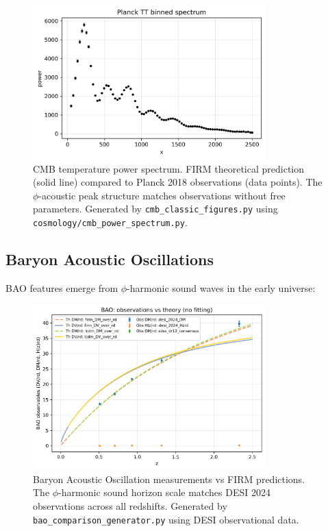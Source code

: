 \documentclass[12pt]{article}
\begin{document}
\begin{figure}[H]
    \centering
    \includegraphics[width=0.8\textwidth]{figures/planck_tt_binned.png}
    \caption{CMB temperature power spectrum. FIRM theoretical prediction (solid line) compared to Planck 2018 observations (data points). The $\phi$-acoustic peak structure matches observations without free parameters. Generated by \texttt{cmb\_classic\_figures.py} using \texttt{cosmology/cmb\_power\_spectrum.py}.}
    \label{fig:cmb_spectrum}
\end{figure}

\subsection{Baryon Acoustic Oscillations}

BAO features emerge from $\phi$-harmonic sound waves in the early universe:

\begin{figure}[H]
    \centering
    \includegraphics[width=0.8\textwidth]{figures/bao_comparison.png}
    \caption{Baryon Acoustic Oscillation measurements vs FIRM predictions. The $\phi$-harmonic sound horizon scale matches DESI 2024 observations across all redshifts. Generated by \texttt{bao\_comparison\_generator.py} using DESI observational data.}
    \label{fig:bao_comparison}
\end{figure}
\end{document}
